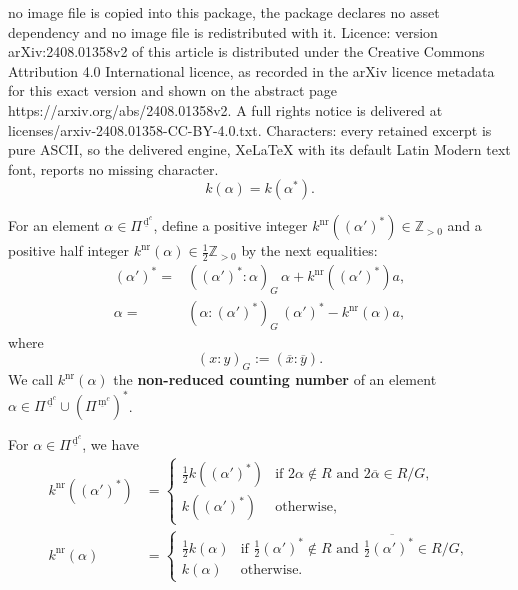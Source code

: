 \documentclass[10pt,a4paper]{amsart}
\newcommand{\Z}{\mathbb{Z}}
\newcommand{\dc}{\,\underline{\mathrm{d}}^c}
\newcommand{\mc}{\, \underline{\mathrm{m}}^c}
\newcommand{\nr}{\mathrm{nr}}
\begin{document}
no image file is copied into this package, the package declares no asset dependency and no image file is redistributed with it. Licence: version arXiv:2408.01358v2 of this article is distributed under the Creative Commons Attribution 4.0 International licence, as recorded in the arXiv licence metadata for this exact version and shown on the abstract page https://arxiv.org/abs/2408.01358v2. A full rights notice is delivered at licenses/arxiv-2408.01358-CC-BY-4.0.txt. Characters: every retained excerpt is pure ASCII, so the delivered engine, XeLaTeX with its default Latin Modern text font, reports no missing character.
\begin{equation}\label{k=kast}
k(\alpha)=k(\alpha^\ast).
\end{equation}

\begin{defn}
For an element $\alpha \in \Pi^{\dc}$, define a positive integer
$k^{\nr}((\alpha')^\ast)\in \Z_{>0}$\index[notations]{k711@$k^{\nr}((\alpha')^\ast)$} and 
a positive half integer 
$k^{\nr}(\alpha)\in\frac12 \Z_{>0}$ by the next equalities{\rm :}
\begin{align} 
(\alpha')^\ast=&((\alpha')^\ast:\alpha)_G\,\alpha + k^{\nr}((\alpha')^\ast)a, 
\label{defn:nr-countings_alpha'-ast}
\\
\alpha=&(\alpha:(\alpha')^\ast)_G\,(\alpha')^\ast-k^{\nr}(\alpha)a,
\label{defn:nr-countings_alpha}
\end{align}
where 
\begin{equation*}
(x:y)_G:=(\overline{x}:\overline{y}).
\end{equation*}
We call $k^{\nr}(\alpha)$\index[notations]{k712@$k^{\nr}(\alpha)$} the 
\textbf{non-reduced counting number}  
of an element $\alpha\in \Pi^{\dc}\cup (\Pi^{\mc})^\ast$.
\end{defn}

\begin{cor}\label{cor:nr-countings1}
For $\alpha\in \Pi^{\dc}$, we have
\begin{align}
k^{\mathrm{nr}}((\alpha')^\ast)&=
\begin{cases}
\frac12 k((\alpha')^\ast) & \text{if }2\alpha\not\in R\text{ and }
2\overline{\alpha}\in R/G,\\
k((\alpha')^\ast) & \text{otherwise},
\end{cases}\label{nr-countings_alpha3}  
\\
k^{\mathrm{nr}}(\alpha)&=
\begin{cases}
\frac12 k(\alpha) & \text{if }\frac12(\alpha')^\ast\not\in R\text{ and }
\frac12\overline{(\alpha')^\ast}\in R/G,\\
k(\alpha) & \text{otherwise}.
\end{cases}\label{nr-countings_alpha4}
\end{align}
\end{cor}
\end{document}
